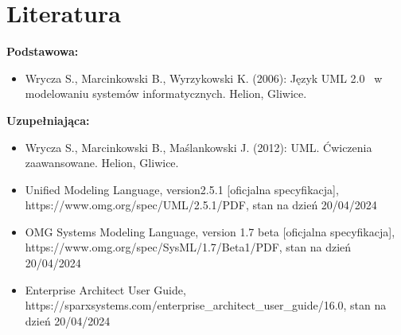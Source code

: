\documentclass[12pt, a4paper]{article}
\begin{document}
\section{Literatura}

\textbf{Podstawowa:}
\begin{itemize}
  \item Wrycza S., Marcinkowski B., Wyrzykowski K. (2006): Język UML 2.0  w modelowaniu systemów informatycznych. Helion, Gliwice.
\end{itemize}

\textbf{Uzupełniająca:}
\begin{itemize}
  \item Wrycza S., Marcinkowski B., Maślankowski J. (2012): UML. Ćwiczenia zaawansowane. Helion, Gliwice.
  \item Unified Modeling Language, version2.5.1 {[}oficjalna specyfikacja{]}, https://www.omg.org/spec/UML/2.5.1/PDF, stan na dzień 20/04/2024
  \item OMG Systems Modeling Language, version 1.7 beta {[}oficjalna specyfikacja{]}, https://www.omg.org/spec/SysML/1.7/Beta1/PDF, stan na dzień 20/04/2024
  \item Enterprise Architect User Guide, https://sparxsystems.com/enterprise\_architect\_user\_guide/16.0, stan na dzień 20/04/2024
\end{itemize}
\end{document}
